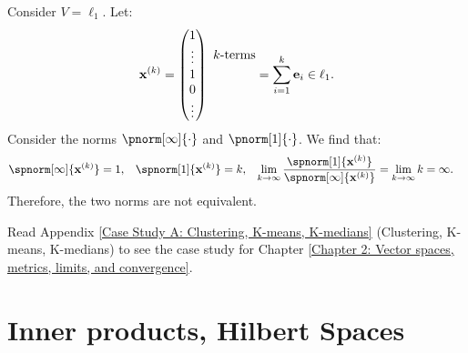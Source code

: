 \documentclass{huhtakm-template-book-v2}
\begin{document}
    \begin{eg}
        Consider $V = \ell_{1}$. Let:
        \begin{equation*}
            \mathbf{x}^{(k)} = \begin{pmatrix}
                1\\
                \vdots\\
                1\\
                0\\
                \vdots
            \end{pmatrix}~\begin{array}{@{} c @{}}
	            \\
	            k\text{-terms}\\[1.5ex]
	            \\
	            \\
	            \mathstrut
            \end{array}=\sum_{i=1}^{k}\mathbf{e}_{i} \in \ell_{1}.
        \end{equation*}
        Consider the norms $\pnorm[\infty]{\cdot}$ and $\pnorm[1]{\cdot}$. We find that:
        \begin{align*}
            \spnorm[\infty]{\mathbf{x}^{(k)}} &= 1, & \spnorm[1]{\mathbf{x}^{(k)}} &= k, & \lim_{k \to \infty}\frac{\spnorm[1]{\mathbf{x}^{(k)}}}{\spnorm[\infty]{\mathbf{x}^{(k)}}} &= \lim_{k \to \infty}k = \infty.
        \end{align*}
        Therefore, the two norms are not equivalent.
    \end{eg}
    
    Read Appendix \ref{Case Study A: Clustering, K-means, K-medians} (Clustering, K-means, K-medians) to see the case study for Chapter \ref{Chapter 2: Vector spaces, metrics, limits, and convergence}.
   
\chapter{Inner products, Hilbert Spaces}
	\label{Chapter 3: Inner products, Hilbert Spaces}
\end{document}
